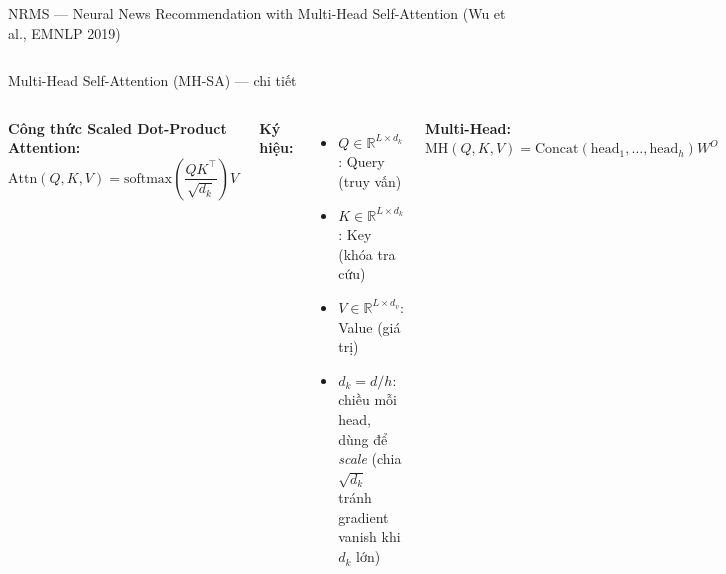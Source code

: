 \documentclass[aspectratio=169,11pt]{beamer}
\begin{document}
\begin{frame}{NRMS --- Neural News Recommendation with Multi-Head Self-Attention (Wu et al., EMNLP 2019)}
\begin{columns}[T]
\begin{center}
      \end{center}
  \end{columns}
\end{frame}

\begin{frame}{Multi-Head Self-Attention (MH-SA) --- chi tiết}
  \begin{columns}[T]
      \textbf{Công thức Scaled Dot-Product Attention:}
      \[
        \text{Attn}(Q,K,V) = \text{softmax}\!\!\left(\frac{QK^\top}{\sqrt{d_k}}\right)\!V
      \]

      \textbf{Ký hiệu:}
      \begin{itemize}
        \item $Q \in \mathbb{R}^{L \times d_k}$: Query (truy vấn)
        \item $K \in \mathbb{R}^{L \times d_k}$: Key (khóa tra cứu)
        \item $V \in \mathbb{R}^{L \times d_v}$: Value (giá trị)
        \item $d_k = d/h$: chiều mỗi head, dùng để \textit{scale}
          (chia $\sqrt{d_k}$ tránh gradient vanish khi $d_k$ lớn)
      \end{itemize}

      \textbf{Multi-Head:} $
        \text{MH}(Q,K,V) = \text{Concat}(\text{head}_1,\dots,\text{head}_h)W^O
$


\end{columns}
\end{frame}
\end{document}
